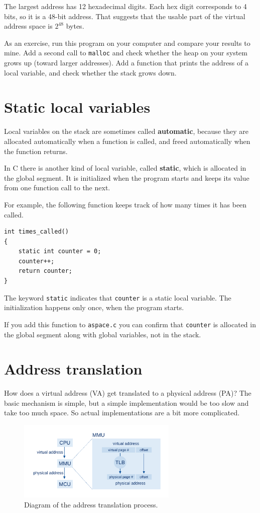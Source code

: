 \documentclass[12pt]{book}
\begin{document}
{The largest address has 12 hexadecimal digits.  Each hex digit
corresponds to 4 bits, so it is a 48-bit address.  That suggests
that the usable part of the virtual address space is $2^{48}$ bytes.

As an exercise, run this program on your computer and compare your
results to mine.  Add a second call to {\tt malloc} and check whether
the heap on your system grows up (toward larger addresses).  Add a
function that prints the address of a local variable, and check
whether the stack grows down.


\section{Static local variables}

Local variables on the stack are sometimes called {\bf automatic},
because they are allocated automatically when a function is called,
and freed automatically when the function returns.

In C there is another kind of local variable, called {\bf static},
which is allocated in the global segment.  It is initialized when
the program starts and keeps its value from one function call to
the next.

For example, the following function keeps track of how many times
it has been called.

\begin{verbatim}
int times_called()
{
    static int counter = 0;
    counter++;
    return counter;
}
\end{verbatim}

The keyword {\tt static} indicates that {\tt counter} is a static
local variable.  The initialization happens only once, when the program
starts.

If you add this function to {\tt aspace.c} you can confirm that
{\tt counter} is allocated in the global segment along with global
variables, not in the stack.


\section{Address translation}
\label{address_translation}

How does a virtual address (VA) get translated to a physical address (PA)?
The basic mechanism is simple, but a simple
implementation would be too slow and take too much space.  So actual
implementations are a bit more complicated.

\begin{figure}
\centerline{\includegraphics[width=3in]{figs/address_translation.pdf}}
\caption{Diagram of the address translation process.}
\label{addtrans}
\end{figure}

}
\end{document}
